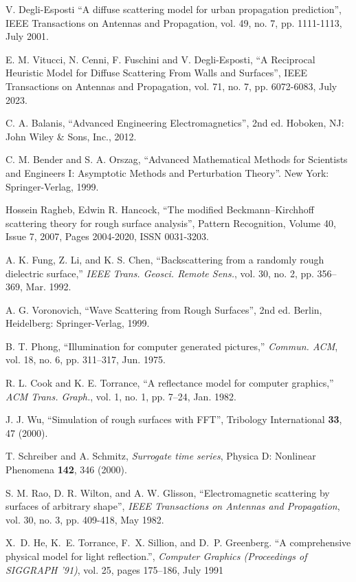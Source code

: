 \documentclass[lettersize,journal]{IEEEtran}
\begin{document}
\begin{thebibliography}{1}


V. Degli-Esposti ``A diffuse scattering model for urban propagation prediction'', IEEE Transactions on Antennas and Propagation, vol. 49, no. 7, pp. 1111-1113, July 2001.

E. M. Vitucci, N. Cenni, F. Fuschini and V. Degli-Esposti, ``A Reciprocal Heuristic Model for Diffuse Scattering From Walls and Surfaces'', IEEE Transactions on Antennas and Propagation, vol. 71, no. 7, pp. 6072-6083, July 2023.

C. A. Balanis, ``Advanced Engineering Electromagnetics'', 2nd ed. Hoboken, NJ: John Wiley \& Sons, Inc., 2012.

C. M. Bender and S. A. Orszag, ``Advanced Mathematical Methods for Scientists and
      Engineers I: Asymptotic Methods and Perturbation Theory''. New York:
      Springer-Verlag, 1999.

Hossein Ragheb, Edwin R. Hancock, ``The modified Beckmann–Kirchhoff scattering theory
      for rough surface analysis'', Pattern Recognition, Volume 40, Issue 7, 2007,
      Pages 2004-2020, ISSN 0031-3203.

A. K. Fung, Z. Li, and K. S. Chen, ``Backscattering from a randomly rough dielectric
      surface,'' \emph{IEEE Trans. Geosci. Remote Sens.}, vol. 30, no. 2, pp.
      356--369, Mar. 1992.

A. G. Voronovich, ``Wave Scattering from Rough Surfaces'', 2nd ed. Berlin,
      Heidelberg: Springer-Verlag, 1999.

B. T. Phong, ``Illumination for computer generated pictures,'' \emph{Commun. ACM}, vol. 18, no. 6, pp. 311--317, Jun. 1975.

R. L. Cook and K. E. Torrance, ``A reflectance model for computer graphics,'' \emph{ACM Trans. Graph.}, vol. 1, no. 1, pp. 7--24, Jan. 1982.

J. J. Wu, ``Simulation of rough surfaces with FFT'', Tribology International \textbf{33}, 47 (2000).

T. Schreiber and A. Schmitz, \textit{Surrogate time series}, 
Physica D: Nonlinear Phenomena \textbf{142}, 346 (2000).

S. M. Rao, D. R. Wilton, and A. W. Glisson, ``Electromagnetic scattering by surfaces
      of arbitrary shape'', \emph{IEEE Transactions on Antennas and Propagation},
      vol. 30, no. 3, pp. 409-418, May 1982.

X.~D. He, K.~E. Torrance, F.~X. Sillion, and D.~P. Greenberg. ``A comprehensive
      physical model for light reflection.'', \emph{ Computer Graphics
      (Proceedings of SIGGRAPH '91)}, vol. 25, pages 175--186, July 1991
\end{thebibliography}

\end{document}
